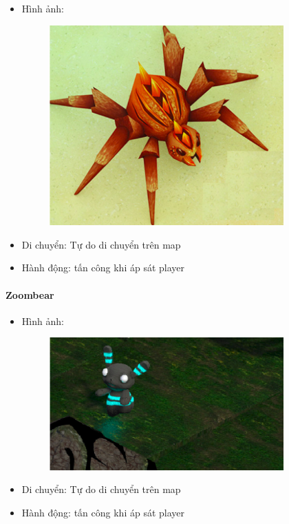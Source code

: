 \documentclass[../report.tex]{subfiles}
\begin{document}
\begin{itemize}
\item Hình ảnh:
\begin{figure}[H]
\centering
\includegraphics[width=9cm]{figures/nhen.png}
\end{figure}

\item Di chuyển: Tự do di chuyển trên map 
\item Hành động: tấn công khi áp sát player

\end{itemize}

\paragraph{Zoombear}
\begin{itemize}
\item Hình ảnh:
\begin{figure}[H]
\centering
\includegraphics[width=9cm]{figures/zoombear.png}
\end{figure}

\item Di chuyển: Tự do di chuyển trên map 
\item Hành động: tấn công khi áp sát player
\end{itemize}
\end{document}
